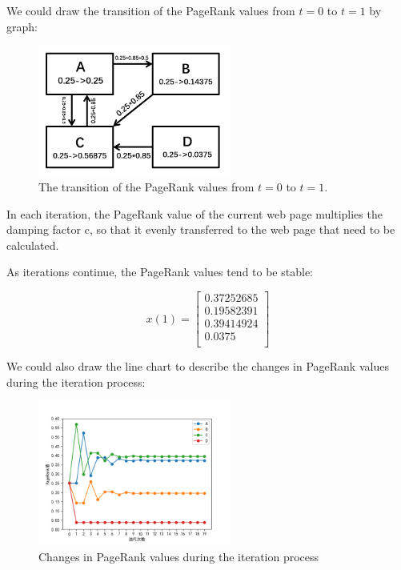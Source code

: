 \documentclass[lettersize,journal,12pt,conference]{IEEEtran}
\begin{document}
We could draw the transition of the PageRank values from $t = 0$ to $t = 1$ by graph:

\begin{figure}[h]
	\centering
	\includegraphics[width=2.5in]{images/fig6.png}
	\caption{The transition of the PageRank values from $t = 0$ to $t = 1$.}
	\label{fig6}
\end{figure}

In each iteration, the PageRank value of the current web page multiplies the damping factor c, so that it evenly transferred to the web page that need to be calculated. 

As iterations continue, the PageRank values tend to be stable:

\begin{equation}
	\label{eq:16}
	x(1) = \begin{bmatrix}
		0.37252685 \\
		0.19582391 \\
		0.39414924 \\
		0.0375 \\
		\end{bmatrix}
\end{equation}

We could also draw the line chart to describe the changes in PageRank values during the iteration process:

\begin{figure}[h]
	\centering
	\includegraphics[width=2.5in]{images/fig7.png}
	\caption{Changes in PageRank values during the iteration process}
	\label{fig7}
\end{figure}
\end{document}
